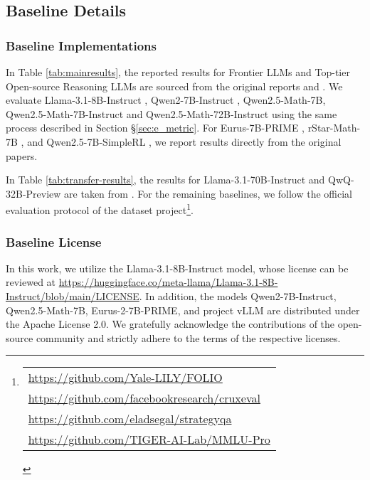 \subsection{Baseline Details}\label{ap:baseline}
\subsubsection{Baseline Implementations}

In Table \ref{tab:mainresults}, the reported results for Frontier LLMs and Top-tier Open-source Reasoning LLMs are sourced from the original reports and \citet{guan2025rstar}. We evaluate Llama-3.1-8B-Instruct \cite{llama3.1}, Qwen2-7B-Instruct \cite{qwen2}, Qwen2.5-Math-7B, Qwen2.5-Math-7B-Instruct and Qwen2.5-Math-72B-Instruct\cite{qwen2.5} using the same process described in Section \S \ref{sec:e_metric}. For Eurus-7B-PRIME \cite{cui2025process}, rStar-Math-7B \cite{guan2025rstar}, and Qwen2.5-7B-SimpleRL \cite{zeng2025simplerl}, we report results directly from the original papers.

In Table \ref{tab:transfer-results}, the results for Llama-3.1-70B-Instruct and QwQ-32B-Preview are taken from \citet{shen2025satori}. For the remaining baselines, we follow the official evaluation protocol of the dataset project\footnote{%
  \begin{tabular}[t]{@{}l@{}}
    \href{https://github.com/Yale-LILY/FOLIO}{https://github.com/Yale-LILY/FOLIO}\\[0.5ex]
    \href{https://github.com/facebookresearch/cruxeval}{https://github.com/facebookresearch/cruxeval}\\[0.5ex]
    \href{https://github.com/eladsegal/strategyqa}{https://github.com/eladsegal/strategyqa}\\[0.5ex]
    \href{https://github.com/TIGER-AI-Lab/MMLU-Pro}{https://github.com/TIGER-AI-Lab/MMLU-Pro}
  \end{tabular}
}.
\subsubsection{Baseline License}

In this work, we utilize the Llama-3.1-8B-Instruct model, whose license can be reviewed at \url{https://huggingface.co/meta-llama/Llama-3.1-8B-Instruct/blob/main/LICENSE}. In addition, the models Qwen2-7B-Instruct, Qwen2.5-Math-7B, Eurus-2-7B-PRIME, and project vLLM are distributed under the Apache License 2.0. We gratefully acknowledge the contributions of the open-source community and strictly adhere to the terms of the respective licenses.


